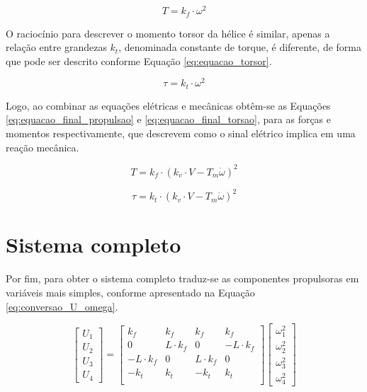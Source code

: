 \documentclass[main.tex]{subfiles}
\begin{document}
\begin{equation}\label{eq:equacao_propulsao}
	T = k_f \cdot \omega^2
\end{equation}

O raciocínio para descrever o momento torsor da hélice é similar, apenas a relação entre grandezas $k_t$, denominada constante de torque, é diferente, de forma que pode ser descrito conforme Equação \ref{eq:equacao_torsor}.

\begin{equation}\label{eq:equacao_torsor}
	\tau = k_t \cdot \omega^2
\end{equation}

Logo, ao combinar as equações elétricas e mecânicas obtêm-se as Equações \ref{eq:equacao_final_propulsao} e \ref{eq:equacao_final_torsao}, para as forças e momentos respectivamente, que descrevem como o sinal elétrico implica em uma reação mecânica.

\begin{equation}\label{eq:equacao_final_propulsao}
	T = k_f \cdot (k_v \cdot V - T_m\dot{\omega})^2
\end{equation}

\begin{equation}\label{eq:equacao_final_torsao}
	\tau = k_t \cdot (k_v \cdot V - T_m\dot{\omega})^2
\end{equation}

\section{Sistema completo}

Por fim, para obter o sistema completo traduz-se as componentes propulsoras em variáveis mais simples, conforme apresentado na Equação \ref{eq:conversao_U_omega}.

\begin{equation}\label{eq:conversao_U_omega}
	\begin{bmatrix}
		U_1\\
		U_2\\
		U_3\\
		U_4
	\end{bmatrix} = 
	\begin{bmatrix}
		k_f		& k_f 	& k_f 	& k_f\\
		0 		& L\cdot k_f 	& 0 	& -L\cdot k_f\\
		-L\cdot k_f	& 0		& L\cdot k_f	& 0\\
		-k_t 	& k_t 	& -k_t 	& k_t\\
	\end{bmatrix}
	\begin{bmatrix}
		\omega_1^2\\
		\omega_2^2\\
		\omega_3^2\\
		\omega_4^2
	\end{bmatrix}
\end{equation}
\end{document}
